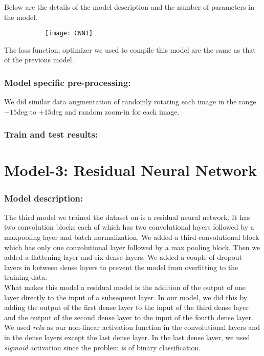 \documentclass{scrreprt}
\begin{document}
Below are the details of the model description and the number of parameters in the model.

\begin{figure}
\begin{subfigure}{0.5\textwidth}
\texttt{[image: CNN1]}
\end{subfigure}
\end{figure}

The loss function, optimizer we used to compile this model are the same as that of the previous model.

\subsubsection{Model specific pre-processing:}
We did similar data augmentation of randomly rotating each image in the range $-15$deg to $+15$deg and random zoom-in for each image.

\subsubsection{Train and test results:}

\section{Model-3: Residual Neural Network}
\subsubsection{Model description:}
The third model we trained the dataset on is a residual neural network. It has two convolution blocks each of which has two convolutional layers followed by a maxpooling layer and batch normalization. We added a third convolutional block which has only one convolutional layer followed by a max pooling block. Then we added a flattening layer and six dense layers. We added a couple of dropout layers in between dense layers to prevent the model from overfitting to the training data.\\

What makes this model a residual model is the addition of the output of one layer directly to the input of a subsequent layer. In our model, we did this by adding the output of the first dense layer to the input of the third dense layer and the output of the second dense layer to the input of the fourth dense layer.\\

We used \textit{relu} as our non-linear activation function in the convolutional layers and in the dense layers except the last dense layer. In the last dense layer, we used \textit{sigmoid} activation since the problem is of binary classification.
\end{document}
